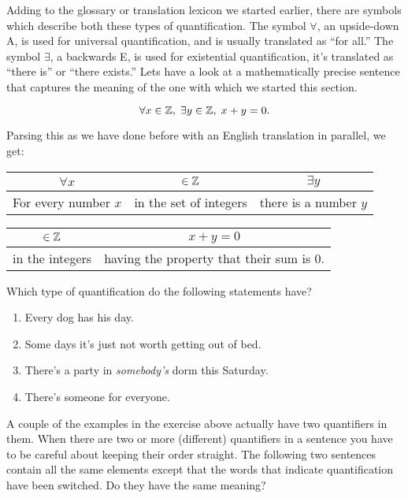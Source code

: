 Adding to the glossary or translation lexicon we started earlier,
there are symbols which describe both these types of quantification.
The symbol $\forall$, an upside-down A, is used for universal
quantification, and is usually translated as ``for all.''  
The symbol $\exists$, a backwards E, is used for existential
quantification, it's translated as ``there is'' or ``there exists.''
Lets have a look at a mathematically precise sentence that captures
the meaning of the one with which we started this section.

\[ \forall x \in {\mathbb Z}, \; \exists y \in {\mathbb Z}, \; x+y=0. \]

Parsing this as we have done before with an English translation in 
parallel, we get:

\vspace{.2in}

\begin{tabular}{c|c|c}
\rule[-10pt]{0pt}{22pt} $\forall x$ & $\in {\mathbb Z}$ & $\exists y$  \\ \hline
\rule[-6pt]{0pt}{22pt} For every number $x$ & in the set of integers &
there is a number $y$ \\
\end{tabular}

\vspace{.2in}

\begin{tabular}{c|c}
\rule[-10pt]{0pt}{22pt} $\in {\mathbb Z}$ & $x+y=0$ \\ \hline
\rule[-6pt]{0pt}{22pt} in the integers  & having the property that
their sum is $0$. \\
\end{tabular}


\vspace{.2in}

\begin{exer} Which type of quantification do the following
statements have?
\begin{enumerate}
\item Every dog has his day.
\item Some days it's just not worth getting out of bed.
\item There's a party in {\em somebody's} dorm this Saturday.
\item There's someone for everyone.
\end{enumerate}
\end{exer}

A couple of the examples in the exercise above actually have two quantifiers
in them.  When there are two or more (different) quantifiers in a sentence
you have to be careful about keeping their order straight.  The following 
two sentences contain all the same elements except that the words that 
indicate quantification have been switched.  Do they have the same meaning?

